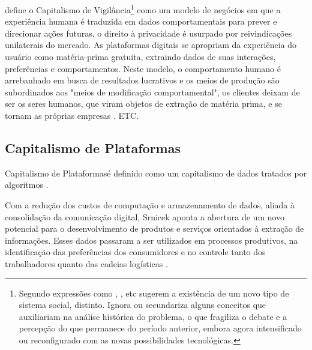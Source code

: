  define o Capitalismo de Vigilância\footnote{\label{nota:novoSistSoc}Segundo \citeauthor{Faustino2023} expressões como , , etc sugerem a existência de um novo tipo de sistema social, distinto. Ignora ou secundariza alguns conceitos que auxiliariam na análise histórica do problema, o que fragiliza o debate e a percepção do que permanece do período anterior, embora agora intensificado ou reconfigurado com as novas possibilidades tecnológicas. } como um modelo de negócios em que a experiência humana é traduzida em dados comportamentais para prever e direcionar ações futuras, o direito à privacidade é usurpado por reivindicações unilaterais do mercado. As plataformas digitais se apropriam da experiência do usuário como matéria-prima gratuita, extraindo dados de suas interações, preferências e comportamentos. Neste modelo, o comportamento humano é arrebanhado em busca de resultados lucrativos e os meios de produção são subordinados aos "meios de modificação comportamental", os clientes deixam de ser os seres humanos, que viram objetos de extração de matéria prima, e se tornam as próprias empresas \cite{Zuboff2019}.
ETC.
\subsection{Capitalismo de Plataformas}
\label{subsec:capPlat}

Capitalismo de Plataformas\footnotemark[\value{footnote}] é definido como um capitalismo de dados tratados por algoritmos \ci. 

Com a redução dos custos de computação e armazenamento de dados, aliada à consolidação da comunicação digital, Srnicek aponta a abertura de um novo potencial para o desenvolvimento de produtos e serviços orientados à extração de informações. Esses dados passaram a ser utilizados em processos produtivos, na identificação das preferências dos consumidores e no controle tanto dos trabalhadores quanto das cadeias logísticas \cite{silveira-demcodigos}. 

